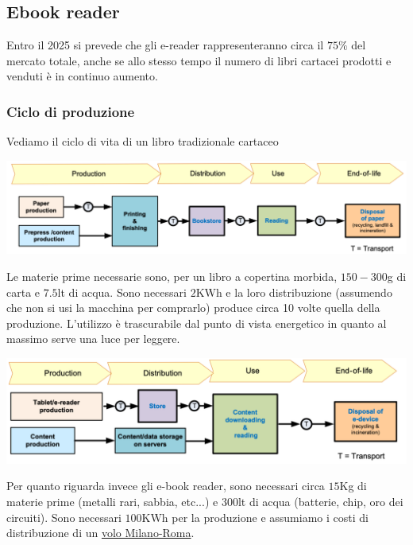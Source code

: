 \subsection{Ebook reader}
Entro il 2025 si prevede che gli e-reader rappresenteranno circa il $75\%$ del mercato totale, anche se allo stesso tempo il numero di libri cartacei prodotti e  venduti è in continuo aumento.

\subsubsection{Ciclo di produzione}
Vediamo il ciclo di vita di un libro tradizionale cartaceo
\begin{center}
	\includegraphics[scale=0.3]{books_lifecycle.png}
\end{center}
Le materie prime necessarie sono, per un libro a copertina morbida, $150-300$g di carta e $7.5$lt di acqua. Sono necessari $2$KWh  e la loro distribuzione (assumendo che non si usi la macchina per comprarlo) produce circa 10 volte quella della produzione. L'utilizzo è trascurabile dal punto di vista energetico in quanto al massimo serve una luce per leggere.
\begin{center}
	\includegraphics[scale=0.3]{ereader_lifecycle.png}
\end{center}
Per quanto riguarda invece gli e-book reader, sono necessari circa $15$Kg di materie prime (metalli rari, sabbia, etc...) e $300$lt di acqua (batterie, chip, oro dei circuiti). Sono necessari $100$KWh per la produzione e assumiamo i costi di distribuzione di un  \href{https://www.icao.int/environmental-protection/Carbonoffset/Pages/default.aspx}{\color{blue}volo Milano-Roma}.

\newpage
